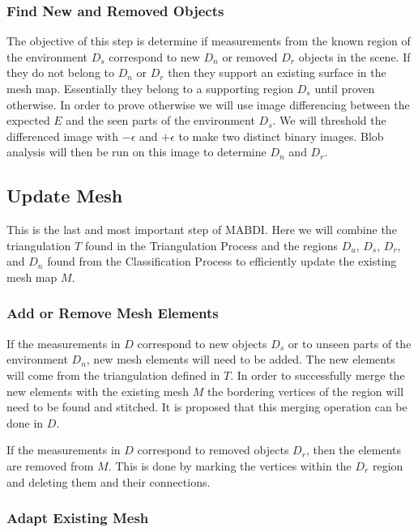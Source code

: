 \documentclass[12pt]{article}
\begin{document}
\subsubsection{Find New and Removed Objects}

The objective of this step is determine if measurements from the known
region of the environment $D_s$ correspond to new $D_n$ or removed $D_r$
objects in the scene. If they do not belong to $D_n$ or $D_r$ then they
support an existing surface in the mesh map. Essentially they belong to
a supporting region $D_s$ until proven otherwise. In order to prove
otherwise we will use image differencing between the expected $E$ and
the seen parts of the environment $D_s$. We will threshold the
differenced image with $-\epsilon$ and $+\epsilon$ to make two distinct
binary images. Blob analysis will then be run on this image to determine
$D_n$ and $D_r$.  

\subsection{Update Mesh}

This is the last and most important step of MABDI. Here
we will combine the triangulation $T$ found in the Triangulation Process
and the regions $D_u$, $D_s$, $D_r$, and $D_n$ found from the
Classification Process to efficiently update the existing mesh map $M$. 

\subsubsection{Add or Remove Mesh Elements}

If the measurements in $D$ correspond to new objects $D_s$ or to unseen
parts of the environment $D_n$, new mesh elements will need to be added.
The new elements will come from the triangulation defined in $T$. In
order to successfully merge the new elements with the existing mesh $M$
the bordering vertices of the region will need to be found and stitched.
It is proposed that this merging operation can be done in $D$. 

If the measurements in $D$ correspond to removed objects $D_r$, then the
elements are removed from $M$. This is done by marking the vertices
within the $D_r$ region and deleting them and their connections.  

\subsubsection{Adapt Existing Mesh}
\end{document}
